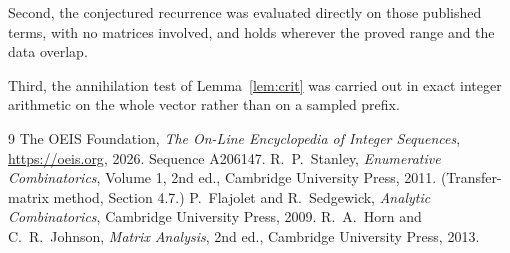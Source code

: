 \documentclass[11pt,a4paper]{article}
\theoremstyle{plain}
\theoremstyle{definition}
\begin{document}
Second, the conjectured recurrence was evaluated directly on those published terms, with no
matrices involved, and holds wherever the proved range and the data overlap.

Third, the annihilation test of Lemma~\ref{lem:crit} was carried out in exact integer
arithmetic on the whole vector rather than on a sampled prefix.

\begin{thebibliography}{9}
 The OEIS Foundation, \emph{The On-Line Encyclopedia of Integer
Sequences}, \url{https://oeis.org}, 2026. Sequence A206147.
 R.~P.~Stanley, \emph{Enumerative Combinatorics}, Volume 1, 2nd ed.,
Cambridge University Press, 2011. (Transfer-matrix method, Section 4.7.)
 P.~Flajolet and R.~Sedgewick, \emph{Analytic Combinatorics}, Cambridge
University Press, 2009.
 R.~A.~Horn and C.~R.~Johnson, \emph{Matrix Analysis}, 2nd ed., Cambridge
University Press, 2013.
\end{thebibliography}
\end{document}
